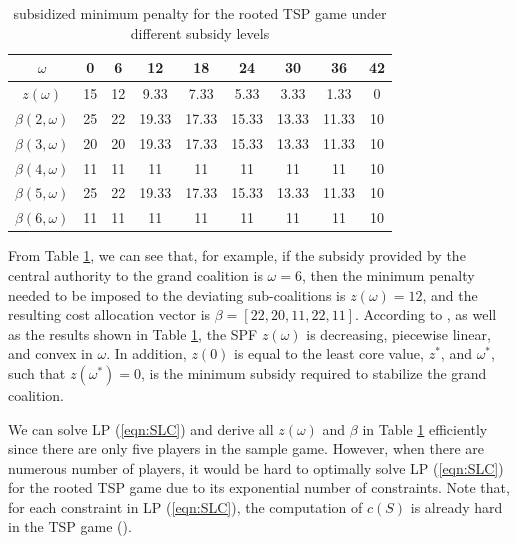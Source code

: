 \documentclass[authoryear,review,12pt]{elsarticle}
\begin{document}
\begin{table}[H]
\centering
\tabcolsep=16pt
\renewcommand\arraystretch{1.25}
\caption{\label{table:example1}subsidized minimum penalty for the rooted TSP game under different subsidy levels}
\begin{tabular}[!h]{c c c c c c c c c}
\hline
$\omega$   &0	&6	&12	&18	&24	&30	&36	&42\\
\hline
$z(\omega)$	&15	&12	&9.33	&7.33	&5.33	&3.33	&1.33	&0\\
$\beta(2,\omega)$	&25	&22	&19.33	&17.33	&15.33	&13.33	&11.33	&10                \\
$\beta(3,\omega)$	&20	&20	&19.33	&17.33	&15.33	&13.33	&11.33	&10                     \\
$\beta(4,\omega)$	&11	&11	&11	&11	&11	&11	&11	&10                     \\
$\beta(5,\omega)$	&25	&22	&19.33	&17.33	&15.33	&13.33	&11.33	&10                     \\
$\beta(6,\omega)$	&11	&11	&11	&11	&11	&11	&11	&10                     \\
\hline
\end{tabular}
\vspace{-2mm}
\end{table}

From Table \ref{table:example1}, we can see that, for example, if the subsidy provided by the central authority to the grand coalition is $\omega=6$, then the minimum penalty needed to be imposed to the deviating sub-coalitions is $z(\omega)=12$, and the resulting cost allocation vector is $\beta=[22,20,11,22,11]$.
According to \cite{leastcore2018}, as well as the results shown in Table \ref{table:example1}, the SPF $z(\omega)$ is decreasing, piecewise linear, and convex in $\omega$.
In addition, $z(0)$ is equal to the least core value, $z^*$, and $\omega^*$, such that $z(\omega^*) = 0$, is the minimum subsidy required to stabilize the grand coalition.

We can solve LP (\ref{eqn:SLC}) and derive all $z(\omega)$ and $\beta$ in Table \ref{table:example1} efficiently since there are only five players in the sample game.
However, when there are numerous number of players, it would be hard to optimally solve LP (\ref{eqn:SLC}) for the rooted TSP game due to its exponential number of constraints.
Note that, for each constraint in LP (\ref{eqn:SLC}), the computation of $c(S)$ is already hard in the TSP game (\citealt{woeginger2003exact}).
\end{document}
